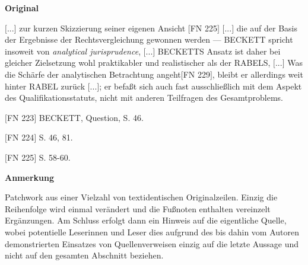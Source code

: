 \documentclass[ngerman,final,fontsize=12pt,paper=a4,twoside,bibliography=totocnumbered,BCOR=8mm,draft=false]{scrartcl}
\newenvironment{fragment}
	{\begin{snugshade}}
	{\end{snugshade}
	 \penalty-200
	 \vskip 0pt plus 10mm minus 5mm}
\newenvironment{fragmentpart}[1]
	{\noindent\textbf{#1}\par\penalty500}
	{\par}
\begin{document}
\begin{fragment}
\begin{fragmentpart}{Original \cite[S.~167--168 Z.~19--21,~3--4,~9--11,~16--17,~19--21,~22--23]{Weber-1986}}
{$[$...$]$ zur kurzen Skizzierung seiner eigenen Ansicht $[$FN 225$]$ $[$...$]$ die auf der Basis der Ergebnisse der Rechtsvergleichung gewonnen werden --- BECKETT spricht insoweit von \textsl{analytical jurisprudence}, $[$...$]$ BECKETTS Ansatz ist daher bei gleicher Zielsetzung wohl praktikabler und realistischer als der RABELS, $[$...$]$ Was die Schärfe der analytischen Betrachtung angeht$[$FN 229$]$, bleibt er allerdings weit hinter RABEL zurück $[$...$]$; er befaßt sich auch fast ausschließlich mit dem Aspekt des Qualifikationsstatuts, nicht mit anderen Teilfragen des Gesamtproblems.

$[$FN 223$]$ BECKETT, Question, S. 46.

$[$FN 224$]$ S. 46, 81.

$[$FN 225$]$ S. 58-60.}
\end{fragmentpart}
\begin{fragmentpart}{Anmerkung}
Patchwork aus einer Vielzahl von textidentischen Originalzeilen. Einzig die Reihenfolge wird einmal verändert und die Fußnoten enthalten vereinzelt Ergänzungen. Am Schluss erfolgt dann ein Hinweis auf die eigentliche Quelle, wobei potentielle Leserinnen und Leser dies aufgrund des bis dahin vom Autoren demonstrierten Einsatzes von Quellenverweisen einzig auf die letzte Aussage und nicht auf den gesamten Abschnitt beziehen.
\end{fragmentpart}
\end{fragment}
\hypertarget{Lm-Fragment-060-09}{}
\end{document}

